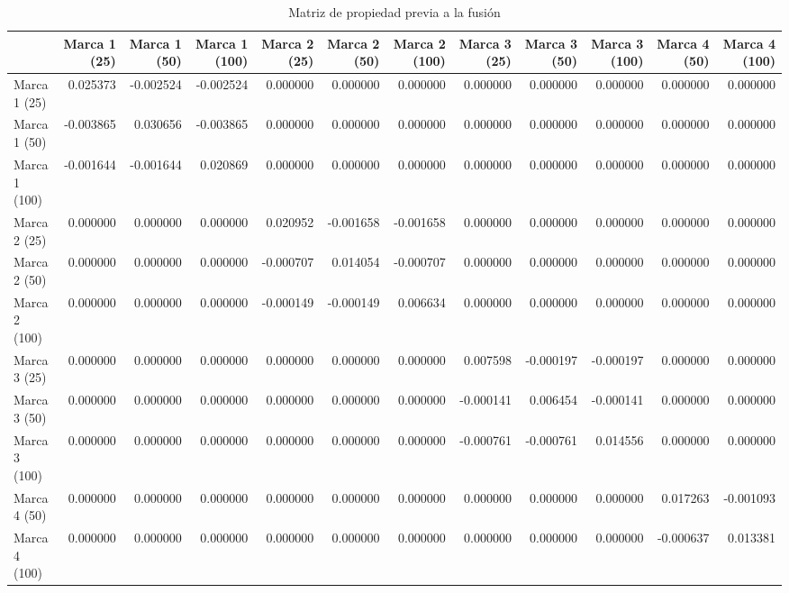 \begin{table}
\centering
\caption{Matriz de propiedad previa a la fusión}
\begin{tabular}{lrrrrrrrrrrr}
\toprule
{} &  Marca 1 (25) &  Marca 1 (50) &  Marca 1 (100) &  Marca 2 (25) &  Marca 2 (50) &  Marca 2 (100) &  Marca 3 (25) &  Marca 3 (50) &  Marca 3 (100) &  Marca 4 (50) &  Marca 4 (100) \\
\midrule
Marca 1 (25)  &      0.025373 &     -0.002524 &      -0.002524 &      0.000000 &      0.000000 &       0.000000 &      0.000000 &      0.000000 &       0.000000 &      0.000000 &       0.000000 \\
Marca 1 (50)  &     -0.003865 &      0.030656 &      -0.003865 &      0.000000 &      0.000000 &       0.000000 &      0.000000 &      0.000000 &       0.000000 &      0.000000 &       0.000000 \\
Marca 1 (100) &     -0.001644 &     -0.001644 &       0.020869 &      0.000000 &      0.000000 &       0.000000 &      0.000000 &      0.000000 &       0.000000 &      0.000000 &       0.000000 \\
Marca 2 (25)  &      0.000000 &      0.000000 &       0.000000 &      0.020952 &     -0.001658 &      -0.001658 &      0.000000 &      0.000000 &       0.000000 &      0.000000 &       0.000000 \\
Marca 2 (50)  &      0.000000 &      0.000000 &       0.000000 &     -0.000707 &      0.014054 &      -0.000707 &      0.000000 &      0.000000 &       0.000000 &      0.000000 &       0.000000 \\
Marca 2 (100) &      0.000000 &      0.000000 &       0.000000 &     -0.000149 &     -0.000149 &       0.006634 &      0.000000 &      0.000000 &       0.000000 &      0.000000 &       0.000000 \\
Marca 3 (25)  &      0.000000 &      0.000000 &       0.000000 &      0.000000 &      0.000000 &       0.000000 &      0.007598 &     -0.000197 &      -0.000197 &      0.000000 &       0.000000 \\
Marca 3 (50)  &      0.000000 &      0.000000 &       0.000000 &      0.000000 &      0.000000 &       0.000000 &     -0.000141 &      0.006454 &      -0.000141 &      0.000000 &       0.000000 \\
Marca 3 (100) &      0.000000 &      0.000000 &       0.000000 &      0.000000 &      0.000000 &       0.000000 &     -0.000761 &     -0.000761 &       0.014556 &      0.000000 &       0.000000 \\
Marca 4 (50)  &      0.000000 &      0.000000 &       0.000000 &      0.000000 &      0.000000 &       0.000000 &      0.000000 &      0.000000 &       0.000000 &      0.017263 &      -0.001093 \\
Marca 4 (100) &      0.000000 &      0.000000 &       0.000000 &      0.000000 &      0.000000 &       0.000000 &      0.000000 &      0.000000 &       0.000000 &     -0.000637 &       0.013381 \\
\bottomrule
\end{tabular}
\end{table}
